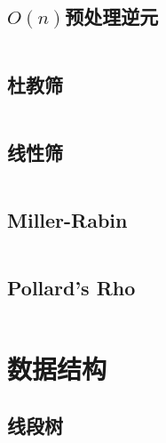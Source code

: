 \documentclass[a4paper]{article}
\begin{document}
\begin{multicols}{2}
			\subsection{$O(n)$预处理逆元}
				\inputminted{cpp}{../src/numbertheory/O(n)求逆元.cpp}

			\subsection{杜教筛}
				\inputminted{cpp}{../src/numbertheory/杜教筛.cpp}
			
			\subsection{线性筛}
				\inputminted{cpp}{../src/numbertheory/扩展线性筛.cpp}



			\subsection{Miller-Rabin}
				\inputminted{cpp}{../src/numbertheory/Miller-Rabin.cpp}

			\subsection{Pollard's Rho}
				\inputminted{cpp}{../src/numbertheory/Pollard's Rho.cpp}
			


				

		\section{数据结构}

			\subsection{线段树}


\end{multicols}
\end{document}

